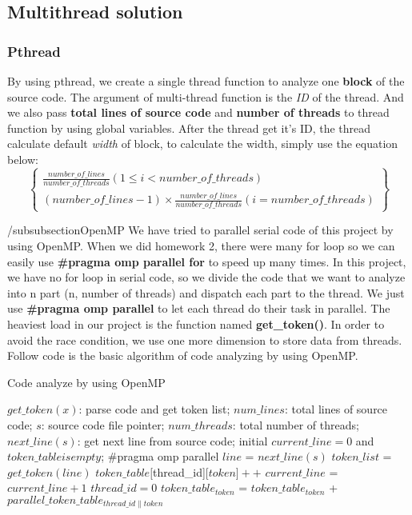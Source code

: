 \documentclass{acm_proc_article-sp}
\begin{document}
\subsection{Multithread solution}
\subsubsection{Pthread}
	By using pthread, we create a single thread function to analyze one \textbf{block}
	of the source code. The argument of multi-thread function is the \textit{ID} of the thread.
	And we also pass \textbf{total lines of source code} and \textbf{number of threads} to
	thread function by using global variables.
	After the thread get it's ID, the thread calculate default \textit{width} of block, to calculate
	the width, simply use the equation below:
	\begin{displaymath}
	\begin{Bmatrix}
	\frac{number\_of\_lines}{number\_of\_threads} (1\leq i< number\_of\_threads)\\ 
	(number\_of\_lines - 1)\times \frac{number\_of\_lines}{number\_of\_threads} (i= number\_of\_threads)
	\end{Bmatrix}
	\end{displaymath}
	
/subsubsection{OpenMP}
We have tried to parallel serial code of this project by using OpenMP. When we did homework 2, there were many for loop so we can easily use \textbf{\#pragma omp parallel for} to speed up many times. In this project, we have no for loop in serial code, so we divide the code that we want to analyze into n part (n, number of threads) and dispatch each part to the thread. We just use \textbf{\#pragma omp parallel} to let each thread do their task in parallel. The heaviest load in our project is the function named \textbf{get\_token()}. In order to avoid the race condition, we use one more dimension to store data from threads.
Follow code is the basic algorithm of code analyzing by using OpenMP.
\begin{algorithm}[h]
		\caption{Code analyze by using OpenMP}
		\begin{algorithmic}[1]
			\Require
				$get\_token(x)$: parse code and get token list;
				$num\_lines$: total lines of source code;
				$s$: source code file pointer;
				$num\_threads$: total number of threads;
				$next\_line(s)$: get next line from source code;
			\State initial $current\_line=0$ and $token\_table is empty$;
			\State \#pragma omp parallel
			\Repeat
				\State $line$ = $next\_line(s)$
				\State $token\_list$ = $get\_token(line)$
					\State $token\_table[$thread\_id][$token]++$
				\EndFor
				\State $current\_line$ = $current\_line + 1$
				\State $thread\_id = 0$
					\State $token\_table_{token}$ = $token\_table_{token}$ + $parallel\_token\_table_{thread\_id\|token}$
				\EndWhile
			\EndFor
		\end{algorithmic}
\end{algorithm}
\end{document}

